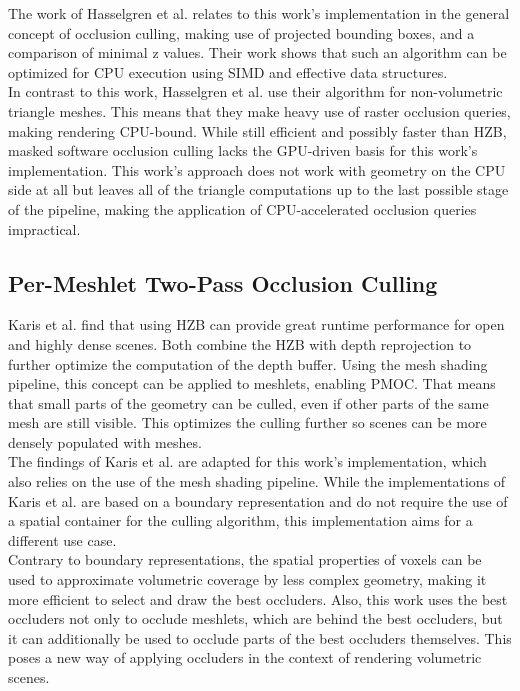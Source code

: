 \noindent
The work of Hasselgren et al. relates to this work's implementation in the general concept of occlusion culling, making 
use of projected bounding boxes, and a comparison of minimal z values. Their work shows that such an algorithm can be 
optimized for \ac{CPU} execution using \ac{SIMD} and effective data structures. \\

\noindent 
In contrast to this work, Hasselgren et al. use their algorithm for non-volumetric triangle meshes. This means that 
they make heavy use of raster occlusion queries, making rendering CPU-bound. While still efficient and possibly faster 
than \ac{HZB}, masked software occlusion culling lacks the \ac{GPU}-driven basis for this work's implementation. This 
work's approach does not work with geometry on the \ac{CPU} side at all but leaves all of the triangle computations up 
to the last possible stage of the pipeline, making the application of \ac{CPU}-accelerated occlusion queries impractical.


\subsection*{Per-Meshlet Two-Pass Occlusion Culling}

Karis et al. \cite{Karis2021} find that using \ac{HZB} can provide great 
runtime performance for open and highly dense scenes. Both combine the \ac{HZB} with depth reprojection to further optimize 
the computation of the depth buffer. Using the mesh shading pipeline, this concept can be applied to meshlets, enabling 
\ac{PMOC}. That means that small parts of the geometry can be culled, even if other parts of the same mesh are 
still visible. This optimizes the culling further so scenes can be more densely populated with meshes. \\

\noindent
The findings of Karis et al. are adapted for this work's implementation, which also relies on the use of the mesh shading 
pipeline. While the implementations of Karis et al. are based on a boundary representation and do not require the use of 
a spatial container for the culling algorithm, this implementation aims for a different use case. \\


\noindent
Contrary to boundary representations, the spatial properties of voxels 
can be used to approximate volumetric coverage by less complex geometry, making it more efficient to select and draw the 
best occluders. Also, this work uses the best occluders not only to occlude meshlets, which are behind the best occluders, 
but it can additionally be used to occlude parts of the best occluders themselves. This poses a new way of applying occluders 
in the context of rendering volumetric scenes.

